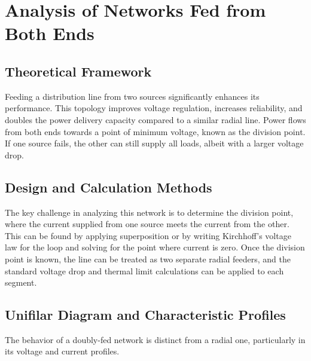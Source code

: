 \documentclass[12pt, a4paper]{article}
\begin{document}
\section{Analysis of Networks Fed from Both Ends}
\subsection{Theoretical Framework}
Feeding a distribution line from two sources significantly enhances its performance. This topology improves voltage regulation, increases reliability, and doubles the power delivery capacity compared to a similar radial line. Power flows from both ends towards a point of minimum voltage, known as the division point. If one source fails, the other can still supply all loads, albeit with a larger voltage drop.

\subsection{Design and Calculation Methods}
The key challenge in analyzing this network is to determine the division point, where the current supplied from one source meets the current from the other. This can be found by applying superposition or by writing Kirchhoff's voltage law for the loop and solving for the point where current is zero. Once the division point is known, the line can be treated as two separate radial feeders, and the standard voltage drop and thermal limit calculations can be applied to each segment.

\subsection{Unifilar Diagram and Characteristic Profiles}
The behavior of a doubly-fed network is distinct from a radial one, particularly in its voltage and current profiles.
\end{document}
